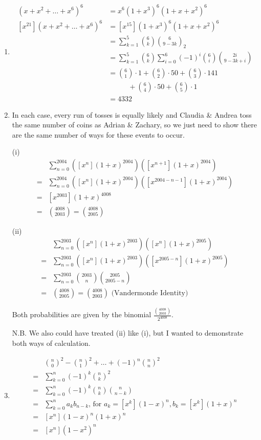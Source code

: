 \documentclass{book}
\numberwithin{equation}{section}
\begin{document}
\begin{enumerate}[label={8.\arabic*}]
\item
\begin{align*}
(x+x^2 + \ldots + x^6)^6 & = x^6(1 + x^3)^6(1 + x + x^2)^6 \\
[x^{21}](x+x^2+\ldots + x^6)^6 & = [x^{15}](1+x^3)^6(1 + x + x^2)^6 \\
& = \sum_{k=1}^5 {6 \choose k}{6 \choose 9-3k}_2 \\
& = \sum_{k=1}^5 {6 \choose k}\sum_{i=0}^6 (-1)^i {6 \choose i}{2i \choose 9-3k+i} \\
& = {6 \choose 1}\cdot 1 + {6 \choose 2}\cdot 50 + {6 \choose 3}\cdot141 \\
& \;\;\;\;\;\;\;\;\;\; + {6 \choose 4}\cdot 50 + {6 \choose 5}\cdot 1 \\
& = 4332
\end{align*}

\item
In each case, every run of tosses is equally likely and Claudia \& Andrea toss the same number of coins as
Adrian \& Zachary, so we just need to show there are the same number of ways for these events to occur.

(i)
\begin{align*}
& \sum_{n=0}^{2004} ([x^n](1+x)^{2004})([x^{n+1}](1+x)^{2004}) \\
= & \sum_{n=0}^{2004} ([x^n](1+x)^{2004})([x^{2004-n-1}](1+x)^{2004}) \\
= & [x^{2003}](1+x)^{4008} \\
= & {4008 \choose 2003} = {4008 \choose 2005}
\end{align*}

(ii) 
\begin{align*}
& \sum_{n=0}^{2003} ([x^n](1+x)^{2003})([x^n](1+x)^{2005}) \\
= & \sum_{n=0}^{2003} ([x^n](1+x)^{2003})([x^{2005-n}](1+x)^{2005}) \\
= & \sum_{n=0}^{2003} {2003 \choose n}{2005 \choose 2005-n} \\
= & {4008 \choose 2005} = {4008 \choose 2003} \text{ (Vandermonde Identity)}
\end{align*}

Both probabilities are given by the binomial $\frac{{4008 \choose 2003}}{2^{4008}}$.

N.B. We also could have treated (ii) like (i), but I wanted to demonstrate both ways of calculation.

\item
\begin{align*}
& {n \choose 0}^2 - {n \choose 1}^2 + \ldots + (-1)^n {n \choose n}^2 \\
= & \sum_{k=0}^n (-1)^k {n \choose k}^2 \\
= & \sum_{k=0}^n (-1)^k {n \choose k}{n \choose n-k} \\
= & \sum_{k=0}^n a_k b_{n-k} \text{, for }a_k = [x^k](1-x)^n, b_k = [x^k](1+x)^n \\
= & [x^n](1-x)^n(1+x)^n \\
= & [x^n](1-x^2)^n
\end{align*}


\end{enumerate}
\end{document}
